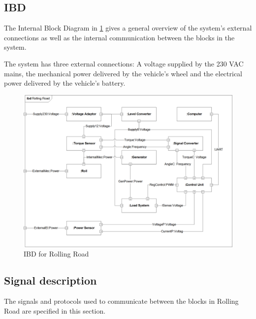 \subsection{IBD}
The Internal Block Diagram in \ref{fig:RR_IBD} gives a general overview of the system's external connections as well as the internal communication between the blocks in the system.

The system has three external connections: A voltage supplied by the 230 VAC mains, the mechanical power delivered by the vehicle's wheel and the electrical power delivered by the vehicle's battery.


\begin{figure}[H]
	\centering
	\includegraphics[width=0.9\linewidth]{Architecture/IBD_RollingRoad}
	\caption{IBD for Rolling Road}
	\label{fig:RR_IBD}
\end{figure}

\subsection{Signal description}
The signals and protocols used to communicate between the blocks in Rolling Road are specified in this section.

